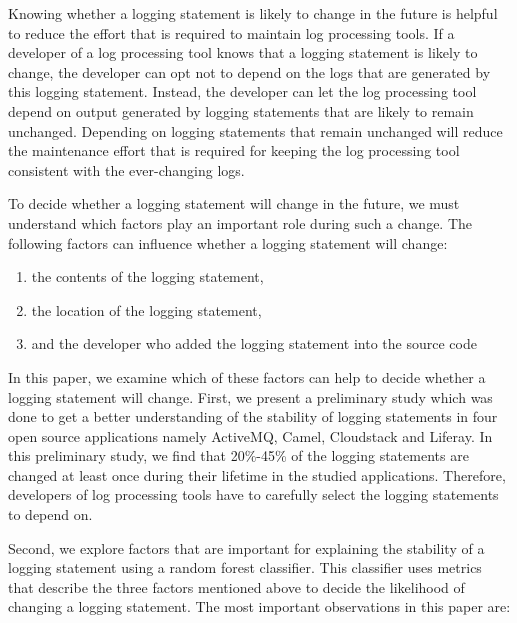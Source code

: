 Knowing whether a logging statement is likely to change in the future is helpful to reduce the effort that is required to maintain log processing tools. If a developer of a log processing tool knows that a logging statement is likely to change, the developer can opt not to depend on the logs that are generated by this logging statement. Instead, the developer can let the log processing tool depend on output generated by logging statements that are likely to remain unchanged. Depending on logging statements that remain unchanged will reduce the maintenance effort that is required for keeping the log processing tool consistent with the ever-changing logs. 


To decide whether a logging statement will change in the future, we must understand which factors play an important role during such a change. The following factors can influence whether a logging statement will change:
\begin{enumerate} 
\item the contents of the logging statement,
\item the location of the logging statement,
\item and the developer who added the logging statement into the source code
\end{enumerate}
In this paper, we examine which of these factors can help to decide whether a logging statement will change. First, we present a preliminary study which was done to get a better understanding of the stability of logging statements in four open source applications namely ActiveMQ, Camel, Cloudstack and Liferay. In this preliminary study, we find that 20\%-45\% of the logging statements are changed at least once during their lifetime in the studied applications. Therefore, developers of log processing tools have to carefully select the logging statements to depend on. 

Second, we explore factors that are important for explaining the stability of a logging statement using a random forest classifier. This classifier uses metrics that describe the three factors mentioned above to decide the likelihood of changing a logging statement.
The most important observations in this paper are:




